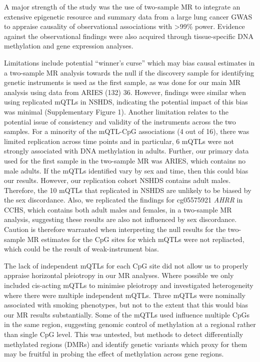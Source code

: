 \documentclass[11pt,twoside]{bristolthesis}
\begin{document}
A major strength of the study was the use of two-sample MR to integrate an extensive epigenetic resource and summary data from a large lung cancer GWAS to appraise causality of observational associations with \textgreater99\% power. Evidence against the observational findings were also acquired through tissue-specific DNA methylation and gene expression analyses.

Limitations include potential ``winner's curse'' which may bias causal estimates in a two-sample MR analysis towards the null if the discovery sample for identifying genetic instruments is used as the first sample, as was done for our main MR analysis using data from ARIES (132) 36. However, findings were similar when using replicated mQTLs in NSHDS, indicating the potential impact of this bias was minimal (Supplementary Figure 1). Another limitation relates to the potential issue of consistency and validity of the instruments across the two samples. For a minority of the mQTL-CpG associations (4 out of 16), there was limited replication across time points and in particular, 6 mQTLs were not strongly associated with DNA methylation in adults. Further, our primary data used for the first sample in the two-sample MR was ARIES, which contains no male adults. If the mQTLs identified vary by sex and time, then this could bias our results. However, our replication cohort NSHDS contains adult males. Therefore, the 10 mQTLs that replicated in NSHDS are unlikely to be biased by the sex discordance. Also, we replicated the findings for cg05575921 \emph{AHRR} in CCHS, which contains both adult males and females, in a two-sample MR analysis, suggesting these results are also not influenced by sex discordance. Caution is therefore warranted when interpreting the null results for the two-sample MR estimates for the CpG sites for which mQTLs were not repliacted, which could be the result of weak-instrument bias.

The lack of independent mQTLs for each CpG site did not allow us to properly appraise horizontal pleiotropy in our MR analyses. Where possible we only included cis-acting mQTLs to minimise pleiotropy and investigated heterogeneity where there were multiple independent mQTLs. Three mQTLs were nominally associated with smoking phenotypes, but not to the extent that this would bias our MR results substantially. Some of the mQTLs used influence multiple CpGs in the same region, suggesting genomic control of methylation at a regional rather than single CpG level. This was untested, but methods to detect differentially methylated regions (DMRs) and identify genetic variants which proxy for them may be fruitful in probing the effect of methylation across gene regions.
\end{document}
